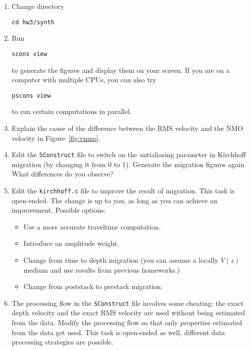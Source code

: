 \begin{enumerate}
\begin{enumerate}
\item Change directory 
\begin{verbatim}
cd hw3/synth
\end{verbatim}
\item Run
\begin{verbatim}
scons view
\end{verbatim}
to generate the figures and display them on your screen.
If you are on a computer with multiple CPUs, you
can also try
\begin{verbatim}
pscons view
\end{verbatim}
to run certain computations in parallel.
\item Explain the cause of the difference between the RMS velocity and the NMO velocity in Figure~\ref{fig:vnmo}.
\item Edit the \texttt{SConstruct} file to switch on the antialiasing parameter in Kirchhoff migration 
(by changing it from 0 to 1). Generate the migration figures again. What differences do you observe?
\item Edit the \texttt{kirchhoff.c} file to improve the result of migration. This task is open-ended. 
The change is up to you, as long as you can achieve an improvement. Possible options:
\begin{itemize}
\item Use a more accurate traveltime computation.
\item Introduce an amplitude weight.
\item Change from time to depth migration (you can assume a locally $V(z)$ medium and use results from previous homeworks.)
\item Change from poststack to prestack migration.
\end{itemize}
\item The processing flow in the \texttt{SConstruct} file involves some cheating: the exact 
depth velocity and the exact RMS velocity are used without being
estimated from the data. Modify the processing flow so that only
properties estimated from the data get used. This task is open-ended
as well, different data processing strategies are possible.
\end{enumerate}

\lstset{language=python,numbers=left,numberstyle=\tiny,showstringspaces=false}


\lstset{language=c,numbers=left,numberstyle=\tiny,showstringspaces=false}



\end{enumerate}

